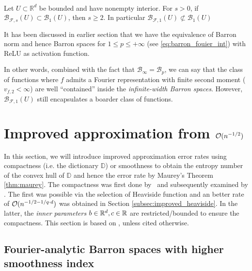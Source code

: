 \begin{theorem}~\cite[Proposition 7.4]{carageaNeuralNetworkApproximation2022}

    Let $U \subset \mathbb{R}^d$ be bounded and have nonempty interior. For
    $s>0$, if $\mathcal{B}_{\mathcal{F},s}(U) \subset \mathcal{B}_{1}(U)$, then
    $s \geq 2$. In particular $\mathcal{B}_{\mathcal{F},1}(U) \not\subset
        \mathcal{B}_{1}(U)$
\end{theorem}

\begin{remark}
    It has been discussed in earlier section that we have the equivalence of
    Barron norm and hence Barron spaces for $1 \leq p\leq +\infty$ (see
    \eqref{eq:barron_fouier_int}) with ReLU as activation function.

    In other words, combined with the fact that
    $\mathcal{B}_{\infty}=\mathcal{B}_p$, we can say that the class of functions
    where $f$ admits a Fourier representation with finite second moment ($v_{f,
    2} < \infty$) are well ``contained'' inside the \textit{infinite-width
    Barron spaces}. However, $\mathcal{B}_{\mathcal{F}, 1}(U)$ still
    encapsulates a boarder class of functions.
\end{remark}


\section{Improved approximation from $\mathcal{O}(n^{-1/2})$}


In this section, we will introduce improved approximation error rates using
compactness (i.e. the dictionary $\mathbb{D}$) or smoothness to obtain the
entropy number of the convex hull of $\mathbb{D}$ and hence the error rate by
Maurey's Theorem \eqref{thm:maurey}. The compactness was first done
by~\cite{makovozRandomApproximantsNeural1996} and subsequently examined by
\cite{klusowskiApproximationCombinationsReLU2018,siegelSharpBoundsApproximation2022}.
The first was possible via the selection of Heaviside function and an better
rate of $\mathcal{O}(n^{-1/2 - 1/q\cdot d})$ was obtained in Section
\ref{subsec:improved_heaviside}. In the latter, the \textit{inner parameters}
$b\in\mathbb{R}^d, c\in\mathbb{R}$ are restricted/bounded to ensure the compactness. This
section is based on \cite{maUniformApproximationRates2022,
siegelSharpBoundsApproximation2022,
klusowskiApproximationCombinationsReLU2018a}, unless cited otherwise.

\subsection{Fourier-analytic Barron spaces with higher smoothness index}

